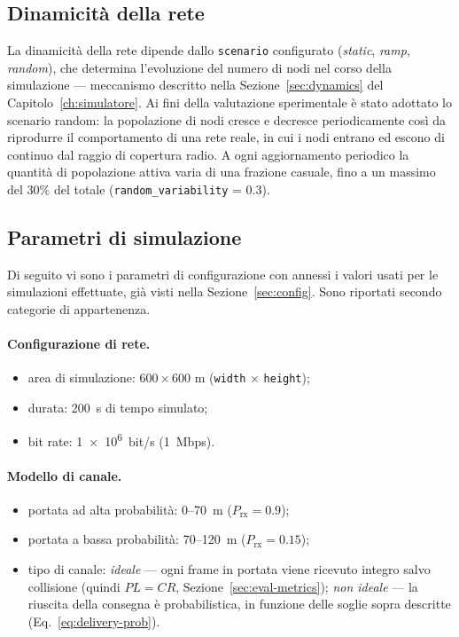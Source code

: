 \subsection{Dinamicit\`a della rete}
\label{sec:scenario}
La dinamicit\`a della rete dipende dallo \texttt{scenario}
configurato (\emph{static}, \emph{ramp}, \emph{random}), che determina
l'evoluzione del numero di nodi nel corso della simulazione --- meccanismo
descritto nella Sezione~\ref{sec:dynamics} del
Capitolo~\ref{ch:simulatore}. Ai fini della valutazione sperimentale \`e stato
adottato lo scenario random: la popolazione di nodi cresce e decresce
periodicamente cos\`i da riprodurre il comportamento di una rete reale, in cui i nodi entrano ed
escono di continuo dal raggio di copertura radio. A ogni aggiornamento periodico la quantit\`a di
popolazione attiva varia di una frazione casuale, fino a un massimo del 30\% del
totale (\texttt{random\_variability} = 0.3).

\subsection{Parametri di simulazione}
\label{sec:eval-params}
Di seguito vi sono i parametri di configurazione con annessi i 
valori usati per le simulazioni effettuate, gi\`a visti nella Sezione~\ref{sec:config}. 
Sono riportati secondo categorie di appartenenza. 

\paragraph{Configurazione di rete.}
\begin{itemize}[leftmargin=1.4em,nosep]
  \item area di simulazione: $600 \times 600$ \si{m} (\texttt{width} $\times$ \texttt{height});
  \item durata: \SI{200}{\second} di tempo simulato;
  \item bit rate: \SI{1e6}{bit/s} (\SI{1}{Mbps}).
\end{itemize}

\paragraph{Modello di canale.}
\begin{itemize}[leftmargin=1.4em,nosep]
  \item portata ad alta probabilit\`a: 0--\SI{70}{\metre} ($P_{\mathrm{rx}} = 0.9$);
  \item portata a bassa probabilit\`a: 70--\SI{120}{\metre} ($P_{\mathrm{rx}} = 0.15$);
  \item tipo di canale: 
  \emph{ideale} --- ogni frame in portata viene ricevuto integro salvo
  collisione (quindi $PL = CR$, Sezione~\ref{sec:eval-metrics});
  \emph{non ideale} --- la riuscita della consegna \`e probabilistica, in funzione delle soglie
  sopra descritte (Eq.~\ref{eq:delivery-prob}).
\end{itemize}


